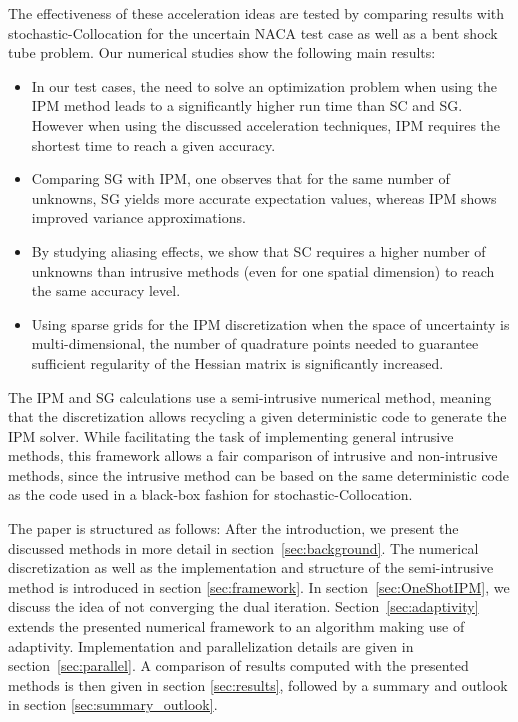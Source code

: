 The effectiveness of these acceleration ideas are tested by comparing results with stochastic-Collocation for the uncertain NACA test case as well as a bent shock tube problem. Our numerical studies show the following main results:
\begin{itemize}
\item In our test cases, the need to solve an optimization problem when using the IPM method leads to a significantly higher run time than SC and SG. However when using the discussed acceleration techniques, IPM requires the shortest time to reach a given accuracy.
\item Comparing SG with IPM, one observes that for the same number of unknowns, SG yields more accurate expectation values, whereas IPM shows improved variance approximations.
\item By studying aliasing effects, we show that SC requires a higher number of unknowns than intrusive methods (even for one spatial dimension) to reach the same accuracy level.
\item Using sparse grids for the IPM discretization when the space of uncertainty is multi-dimensional, the number of quadrature points needed to guarantee sufficient regularity of the Hessian matrix is significantly increased.
\end{itemize}
The IPM and SG calculations use a semi-intrusive numerical method, meaning that the discretization allows recycling a given deterministic code to generate the IPM solver. While facilitating the task of implementing general intrusive methods, this framework allows a fair comparison of intrusive and non-intrusive methods, since the intrusive method can be based on the same deterministic code as the code used in a black-box fashion for stochastic-Collocation.

The paper is structured as follows: After the introduction, we present the discussed methods in more detail in section~\ref{sec:background}. The numerical discretization as well as the implementation and structure of the semi-intrusive method is introduced in section \ref{sec:framework}. In section~\ref{sec:OneShotIPM}, we discuss the idea of not converging the dual iteration. Section~\ref{sec:adaptivity} extends the presented numerical framework to an algorithm making use of adaptivity. Implementation and parallelization details are given in section~\ref{sec:parallel}. A comparison of results computed with the presented methods is then given in section \ref{sec:results}, followed by a summary and outlook in section \ref{sec:summary_outlook}.

